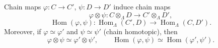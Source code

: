 Chain maps $\varphi : C \rightarrow C'$, $\psi : D \rightarrow D'$ induce chain maps
$$\varphi \otimes \psi : C \otimes_\Lambda D \rightarrow C' \otimes_\Lambda D',$$
$$\operatorname{Hom}(\varphi, \psi) : \operatorname{Hom}_\Lambda(C', D) \rightarrow \operatorname{Hom}_\Lambda(C, D').$$
Moreover, if $\varphi \simeq \varphi'$ and $\psi \simeq \psi'$ (chain homotopic), then
$$\varphi \otimes \psi \simeq \varphi' \otimes \psi', \qquad \operatorname{Hom}(\varphi, \psi) \simeq \operatorname{Hom}(\varphi', \psi').$$
